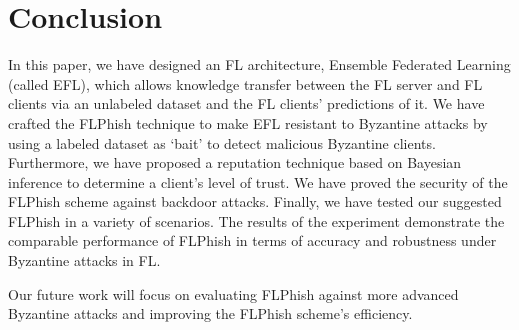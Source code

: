 \documentclass[journal]{IEEEtran}
\begin{document}
\section{Conclusion}
In this paper, we have designed an FL architecture, Ensemble Federated Learning (called EFL), which allows knowledge transfer between the FL server and FL clients via an unlabeled dataset and the FL clients' predictions of it. We have crafted the FLPhish technique to make EFL resistant to Byzantine attacks by using a labeled dataset as `bait' to detect malicious Byzantine clients. Furthermore, we have proposed a reputation technique based on Bayesian inference to determine a client's level of trust. We have proved the security of the FLPhish scheme against backdoor attacks. Finally, we have tested our suggested FLPhish in a variety of scenarios. The results of the experiment demonstrate the comparable performance of FLPhish in terms of accuracy and robustness under Byzantine attacks in FL. 
\par Our future work will focus on evaluating FLPhish against more advanced Byzantine attacks and improving the FLPhish scheme's efficiency.






\end{document}
